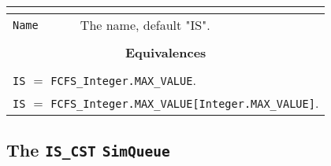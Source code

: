 \documentclass[12pt]{book}
\begin{document}
\begin{tabular}{|l|l|l|l|}
\multicolumn{4}{|c|}{} \\
\hline
\lstinline|Name| & \multicolumn{3}{|l|}{The name, default "IS".} \\
\hline
\multicolumn{4}{|c|}{} \\
\multicolumn{4}{|c|}{\bf Equivalences} \\
\multicolumn{4}{|c|}{} \\
\hline
\multicolumn{4}{|l|}{\lstinline|IS| $=$ \lstinline|FCFS_Integer.MAX_VALUE|.} \\
\multicolumn{4}{|l|}{\lstinline|IS| $=$ \lstinline|FCFS_Integer.MAX_VALUE[Integer.MAX_VALUE]|.} \\
\hline
\end{tabular}

\subsection{The \lstinline{IS_CST} \lstinline{SimQueue}}
\end{document}
